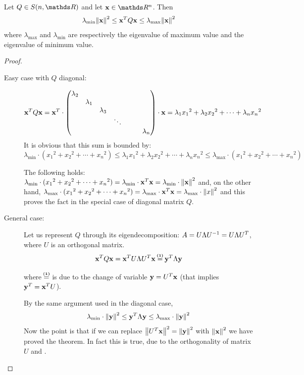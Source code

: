 \documentclass[computationalMathematics.tex]{subfiles}
\begin{document}
\begin{proposition}
  Let $Q \in S(n, \R)$ and let $\vect{x} \in \R^n$. Then 
  \[
    \lambda_{\text{min}} {\left\lVert{\bf x }\right\rVert}^2 \le {{\bf x }}^{T}Q{\bf x } \le \lambda_{\text{max}} {\left\lVert{\bf x }\right\rVert}^2
  \]
  where $\lambda_{\text{max}}$ and $\lambda_{\text{min}}$ are respectively the eigenvalue of maximum value and the eigenvalue of minimum value.
\end{proposition}

\begin{proof}
  \begin{description}
    \item[{\sc Easy case with $Q$ diagonal:}]
    
      \[{{\bf x }}^{T}Q{\bf x } = {{\bf x }}^{T} \cdot \begin{pmatrix}
    \lambda_2\\
    &\lambda_1\\
    &&\lambda_3\\
    &&& \ddots\\
    &&&&&&\lambda_n\\
    \end{pmatrix}
      \cdot {\bf x } = \lambda_1 {x_1}^2 + \lambda_2 {x_2}^2 + \cdots + \lambda_n {x_n}^2
      \]
  It is obvious that this sum is bounded by:
  \[
    \lambda_{\text{min}} \cdot ({x_1}^2 +{x_2}^2 + \cdots + {x_n}^2) \le  \lambda_1 {x_1}^2 + \lambda_2 {x_2}^2 + \cdots + \lambda_n {x_n}^2 \le \lambda_{\text{max}} \cdot ({x_1}^2 +{x_2}^2 + \cdots + {x_n}^2)
  \]

   The following holds: $ \lambda_{\text{min}} \cdot ({x_1}^2 +{x_2}^2 + \cdots + {x_n}^2) =  \lambda_{\text{min}} \cdot {{\bf x }}^{T} {\bf x } =  \lambda_{\text{min}} \cdot {\left\lVert{\bf x }\right\rVert}^2$ and, on the other hand, $ \lambda_{\text{max}} \cdot ({x_1}^2 +{x_2}^2 + \cdots + {x_n}^2) =  \lambda_{\text{max}} \cdot {{\bf x }}^{T} {\bf x } =  \lambda_{\text{max}} \cdot {\left\lVert x\right\rVert}^2$ and this proves the fact in the special case of diagonal matrix $Q$.
    \item[{\sc General case:}]
      Let us represent $Q$ through its eigendecomposition: $A = U \Lambda {U}^{-1} = U \Lambda {U}^{T}$, where $U$ is an orthogonal matrix.
      \[
        \tr{\vect{x}} Q \vect{x} = \tr{\vect{x}} U \Lambda \tr{U} \vect{x} \numeq{(1)} \tr{\vect{y}} \Lambda \vect{y}
      \]

      where $\numeq{(1)}$ is due to the change of variable ${\bf y } = {U}^{T} {\bf x }$ (that implies ${{\bf y }}^{T} = {{\bf x }}^{T} U$).

      By the same argument used in the diagonal case,
      \[
        \lambda_{\text{min}} \cdot {\left\lVert{\bf y }\right\rVert}^2 \le {{\bf y }}^{T} \Lambda {\bf y } \le \lambda_{\text{max}} \cdot {\left\lVert{\bf y }\right\rVert}^2
      \]
      Now the point is that if we can replace ${\left\lVert{U}^{T}{\bf x }\right\rVert}^2 = {\left\lVert{\bf y }\right\rVert}^2$ with ${\left\lVert{\bf x }\right\rVert}^2$ we have proved the theorem.
      In fact this is true, due to the orthogonality of matrix $U$ and .
  \end{description}
\end{proof}
\end{document}
